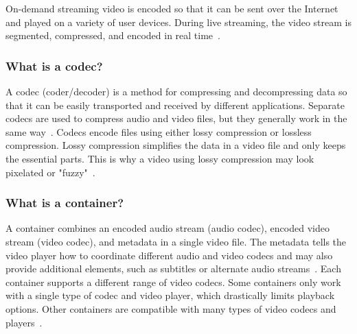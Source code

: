 On-demand streaming video is encoded so that it can be sent over the Internet and played on a variety of user devices. During live streaming, the video stream is segmented, compressed, and encoded in real time~\cite{video-encoding}.

\subsubsection{What is a codec?}
A codec (coder/decoder) is a method for compressing and decompressing data so that it can be easily transported and received by different applications. Separate codecs are used to compress audio and video files, but they generally work in the same way~\cite{video-encoding}.
Codecs encode files using either lossy compression or lossless compression. Lossy compression simplifies the data in a video file and only keeps the essential parts. This is why a video using lossy compression may look pixelated or "fuzzy"~\cite{video-encoding}. 

\subsubsection{What is a container?}
A container combines an encoded audio stream (audio codec), encoded video stream (video codec), and metadata in a single video file. The metadata tells the video player how to coordinate different audio and video codecs and may also provide additional elements, such as subtitles or alternate audio streams~\cite{video-encoding}.
Each container supports a different range of video codecs. Some containers only work with a single type of codec and video player, which drastically limits playback options. Other containers are compatible with many types of video codecs and players~\cite{video-encoding}.

